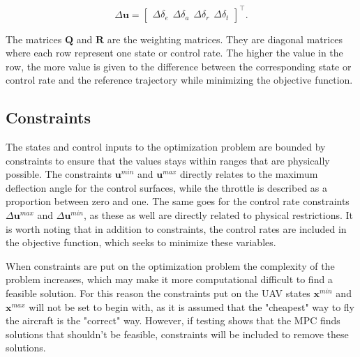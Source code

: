 \begin{equation}
	\label{eq:control_rates}
	\Delta\mathbf{u} = 
	\begin{bmatrix}
		\Delta\delta_e \hspace{5pt} \Delta\delta_a \hspace{5pt} \Delta\delta_r \hspace{5pt} \Delta\delta_t
	\end{bmatrix} ^\intercal .
\end{equation}

The matrices $\mathbf{Q}$ and $\mathbf{R}$ are the weighting matrices. They are diagonal matrices where each row represent one state or control rate. The higher the value in the row, the more value is given to the difference between the corresponding state or control rate and the reference trajectory while minimizing the objective function.


\subsection{Constraints}

The states and control inputs to the optimization problem are bounded by constraints to ensure that the values stays within ranges that are physically possible. The constraints $\mathbf{u}^{min}$ and $\mathbf{u}^{max}$ directly relates to the maximum deflection angle for the control surfaces, while the throttle is described as a proportion between zero and one. The same goes for the control rate constraints $\Delta \mathbf{u}^{max}$ and $\Delta \mathbf{u}^{min}$, as these as well are directly related to physical restrictions. It is worth noting that in addition to constraints, the control rates are included in the objective function, which seeks to minimize these variables.

When constraints are put on the optimization problem the complexity of the problem increases, which may make it more computational difficult to find a feasible solution. For this reason the constraints put on the UAV states $\mathbf{x}^{min}$ and $\mathbf{x}^{max}$ will not be set to begin with, as it is assumed that the "cheapest" way to fly the aircraft is the "correct" way. However, if testing shows that the MPC finds solutions that shouldn't be feasible, constraints will be included to remove these solutions.